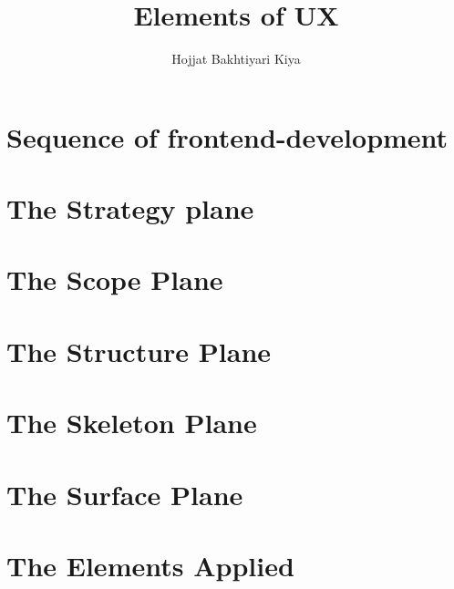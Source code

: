 \documentclass{book}
\author{Hojjat Bakhtiyari Kiya}
\title{Elements of UX}
\begin{document}
\maketitle
\tableofcontents
\chapter{Sequence of frontend-development} 
\chapter{The Strategy plane} 
\chapter{The Scope Plane} 
\chapter{The Structure Plane} 
\chapter{The Skeleton Plane} 
\chapter{The Surface Plane} 
\chapter{The Elements Applied} 
\end{document}
